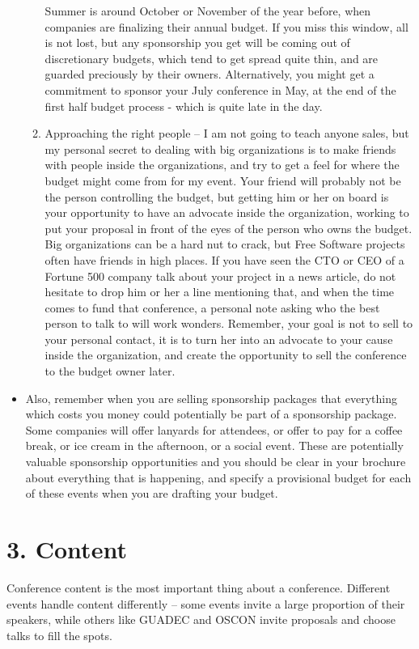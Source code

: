 \begin{itemize}
\begin{enumerate}
Summer is around October or November of the year before, when companies
are finalizing their annual budget.
If you miss this window, all is not lost, but any sponsorship you get
will be coming out of discretionary budgets, which tend to get spread
quite thin, and are guarded preciously by their owners. Alternatively,
you might get a commitment to sponsor your July conference in May, at
the end of the first half budget process - which is quite late in the day.
  \item Approaching the right people -- I am not going to teach anyone sales,
but my personal secret to dealing with big organizations is to make
friends with people inside the organizations, and try to get a feel for
where the budget might come from for my event. Your friend will probably
not be the person controlling the budget, but getting him or her on
board is your opportunity to have an advocate inside the organization,
working to put your proposal in front of the eyes of the person who owns
the budget.
Big organizations can be a hard nut to crack, but Free Software
projects often have friends in high places. If you have seen the CTO or
CEO of a Fortune 500 company talk about your project in a news article,
do not hesitate to drop him or her a line mentioning that, and when the time
comes to fund that conference, a personal note asking who the best
person to talk to will work wonders. Remember, your goal is not to sell
to your personal contact, it is to turn her into an advocate to your
cause inside the organization, and create the opportunity to sell the
conference to the budget owner later.
 \end{enumerate}
 \item Also, remember when you are selling sponsorship packages that everything
which costs you money could potentially be part of a sponsorship
package. Some companies will offer lanyards for attendees, or offer to
pay for a coffee break, or ice cream in the afternoon, or a social
event. These are potentially valuable sponsorship opportunities and you
should be clear in your brochure about everything that is happening, and
specify a provisional budget for each of these events when you are
drafting your budget.
\end{itemize}

\section*{3. Content}

Conference content is the most important thing about a conference.
Different events handle content differently -- some events invite a large
proportion of their speakers, while others like GUADEC and OSCON invite
proposals and choose talks to fill the spots.

